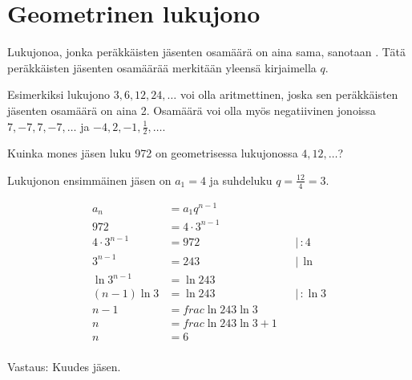\section{Geometrinen lukujono}

Lukujonoa, jonka peräkkäisten jäsenten osamäärä on aina sama, sanotaan . Tätä peräkkäisten jäsenten osamäärää merkitään yleensä kirjaimella $q$.



Esimerkiksi lukujono $3, 6, 12, 24, \ldots$ voi olla aritmettinen, joska sen peräkkäisten jäsenten osamäärä on aina 2. Osamäärä voi olla myös negatiivinen jonoissa  $7, -7, 7, -7, \ldots$ ja  $ -4, 2, -1, \frac{1}{2}, \ldots$.

\begin{esimerkki}

Kuinka mones jäsen luku 972 on geometrisessa lukujonossa $4, 12,  \ldots$?

Lukujonon ensimmäinen jäsen on $a_1=4$ ja suhdeluku $q=\frac{12}{4}=3$.

\begin{align*}
	a_n &= a_1q^{n-1}  \\
	972 &= 4 \cdot 3^{n-1}  \\
	4 \cdot 3^{n-1} &= 972 & & | \, :4 \\
	3^{n-1} &= 243 & & | \, \ln\\
	\ln 3^{n-1} &= \ln 243 \\
	(n-1)\ln 3 &= \ln 243  & & | \, : \ln 3 \\
	n-1 &= frac{\ln 243}{\ln 3} \\
	n &= frac{\ln 243}{\ln 3} +1\\
	n &= 6\\
\end{align*}

Vastaus: Kuudes jäsen.

\end{esimerkki}

